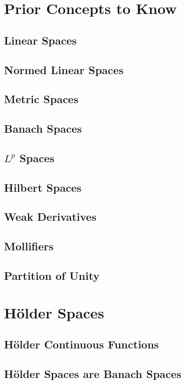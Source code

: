 \documentclass[11pt]{article}
\theoremstyle{definition}
\begin{document}
\pagestyle{fancy}
\fancyhead{}
\tableofcontents
\newpage
\section{Prior Concepts to Know}
\subsection{Linear Spaces}
\subsection{Normed Linear Spaces}
\subsection{Metric Spaces}
\subsection{Banach Spaces}
\subsection{$L^p$ Spaces}
\subsection{Hilbert Spaces}
\subsection{Weak Derivatives}
\subsection{Mollifiers}
\subsection{Partition of Unity}

\newpage

\section{H\"{o}lder Spaces}
\subsection{H\"{o}lder Continuous Functions}
\subsection{H\"{o}lder Spaces are Banach Spaces}
\end{document}
